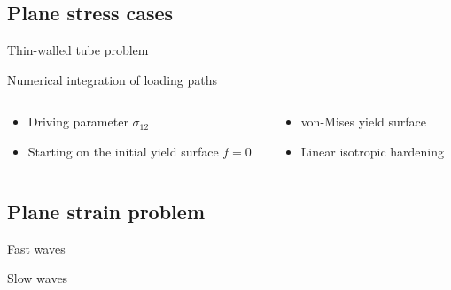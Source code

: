 \subsection{Plane stress cases}
\begin{frame}{Thin-walled tube problem}
  \begin{footnotesize}
    \begin{block}{Numerical integration of loading paths}
      \begin{columns}
        \begin{column}{0.5\textwidth}
          \begin{itemize}
          \item Driving parameter $\sigma_{12}$
          \item Starting on the initial yield surface $f=0$
          \end{itemize}
        \end{column}
        \begin{column}{0.5\textwidth}
          \begin{itemize}
          \item von-Mises yield surface
          \item Linear isotropic hardening
          \end{itemize}
        \end{column}
      \end{columns}
    \end{block}  
  \end{footnotesize}
  \vspace{-0.25cm}
  \begin{block}{}
    \centering
      
  \end{block}
\end{frame}


\subsection{Plane strain problem}
\begin{frame}%
  \begin{block}{Fast waves}
    \vspace{-0.5cm}
    \centering
    
  \end{block}\pause
  \begin{block}{Slow waves}
    \vspace{-0.5cm}
    \centering
    
  \end{block}
   
\end{frame}

